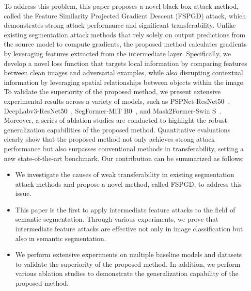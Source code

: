 To address this problem, this paper proposes a novel black-box attack method, called the Feature Similarity Projected Gradient Descent (FSPGD) attack, which demonstrates strong attack performance and significant transferability. Unlike existing segmentation attack methods that rely solely on output predictions from the source model to compute gradients, the proposed method calculates gradients by leveraging features extracted from the intermediate layer. Specifically, we develop a novel loss function that targets local information by comparing features between clean images and adversarial examples, while also disrupting contextual information by leveraging spatial relationships between objects within the image. To validate the superiority of the proposed method, we present extensive experimental results across a variety of models, such as PSPNet-ResNet50~\cite{zhao2017pyramid}, DeepLabv3-ResNet50~\cite{chen2017rethinking}, SegFormer-MiT B0~\cite{xie2021segformer}, and Mask2Former-Swin S~\cite{cheng2022masked}. Moreover, a series of ablation studies are conducted to highlight the robust generalization capabilities of the proposed method. Quantitative evaluations clearly show that the proposed method not only achieves strong attack performance but also surpasses conventional methods in transferability, setting a new state-of-the-art benchmark. Our contribution can be summarized as follows:
 
\begin{itemize}
    \item We investigate the causes of weak transferability in existing segmentation attack methods and propose a novel method, called FSPGD, to address this issue.
    \item This paper is the first to apply intermediate feature attacks to the field of semantic segmentation. Through various experiments, we prove that intermediate feature attacks are effective not only in image classification but also in semantic segmentation.
    \item We perform extensive experiments on multiple baseline models and datasets to validate the superiority of the proposed method. In addition, we perform various ablation studies to demonstrate the generalization capability of the proposed method.
\end{itemize}


